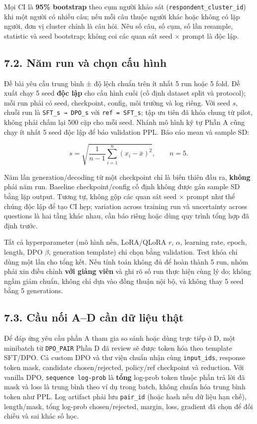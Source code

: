 \documentclass[11pt,a4paper]{article}
\begin{document}
Mọi CI là \textbf{95\% bootstrap} theo cụm người khảo sát
(\nolinkurl{respondent_cluster_id}) khi một người có nhiều câu; nếu mỗi
câu thuộc người khác hoặc không có lặp người, đơn vị cluster chính là
câu hỏi. Nêu số câu, số cụm, số lần resample, statistic và seed
bootstrap; không coi các quan sát seed × prompt là độc lập.

\subsection{7.2. Năm run và chọn cấu
hình}\label{nux103m-run-vuxe0-chux1ecdn-cux1ea5u-huxecnh}

Đề bài yêu cầu trung bình ± độ lệch chuẩn trên ít nhất 5 run hoặc 5
fold. Đề xuất chạy 5 seed \textbf{độc lập} cho cấu hình cuối (cố định
dataset split và protocol); mỗi run phải có seed, checkpoint, config,
môi trường và log riêng. Với seed \(s\), chuỗi run là
\nolinkurl{SFT_s → DPO_s} với \nolinkurl{ref = SFT_s}; tập ưu tiên đã
khóa chung từ pilot, không phải chấm lại 500 cặp cho mỗi seed. Nhánh mô
hình ký tự Phần A cũng chạy ít nhất 5 seed độc lập để báo validation
PPL. Báo cáo mean và sample SD:

\[s=\sqrt{\frac{1}{n-1}\sum_{i=1}^{n}(x_i-\bar{x})^2},\qquad n=5.\]

Năm lần generation/decoding từ một checkpoint chỉ là biến thiên đầu ra,
\textbf{không} phải năm run. Baseline checkpoint/config cố định không
được gán sample SD bằng lặp output. Tương tự, không gộp các quan sát
seed × prompt như thể chúng độc lập để tạo CI hẹp; variation across
training run và uncertainty across questions là hai tầng khác nhau, cần
báo riêng hoặc dùng quy trình tổng hợp đã định trước.

Tất cả hyperparameter (mô hình nền, LoRA/QLoRA \(r\), \(\alpha\),
learning rate, epoch, length, DPO \(\beta\), generation template) chỉ
chọn bằng validation. Test khóa chỉ dùng một lần cho tổng kết. Nếu tính
toán không đủ để hoàn thành 5 run, nhóm phải xin điều chỉnh \textbf{với
giảng viên} và ghi rõ số run thực hiện cùng lý do; không ngầm giảm
chuẩn, không chỉ dựa vào đồng thuận nội bộ, và không thay 5 seed bằng 5
generations.

\subsection{7.3. Cầu nối A--D cần dữ liệu
thật}\label{cux1ea7u-nux1ed1i-ad-cux1ea7n-dux1eef-liux1ec7u-thux1eadt}

Để đáp ứng yêu cầu phần A tham gia so sánh hoặc dùng trực tiếp ở D, một
minibatch từ \nolinkurl{DPO_PAIR} Phần D đã review sẽ được token hóa
theo template SFT/DPO. Cả custom DPO và thư viện chuẩn nhận cùng
\nolinkurl{input_ids}, response token mask, candidate chosen/rejected,
policy/ref checkpoint và reduction. Với vanilla DPO,
\nolinkurl{sequence log-prob} là \textbf{tổng} log-prob token thuộc phần
trả lời đã mask và loss là trung bình theo ví dụ trong batch, không
chuẩn hóa trung bình token như PPL. Log artifact phải lưu
\nolinkurl{pair_id} (hoặc hash nếu dữ liệu hạn chế), length/mask, tổng
log-prob chosen/rejected, margin, loss, gradient đã chọn để đối chiếu và
sai khác số học.
\end{document}
